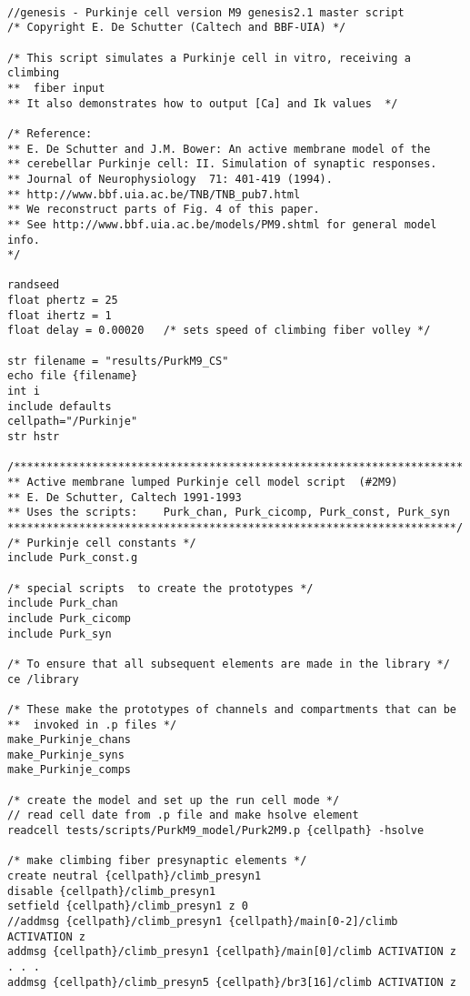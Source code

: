 \documentclass[10pt]{article}
\begin{document}
\begin{linenumbers}
\begin{verbatim}

//genesis - Purkinje cell version M9 genesis2.1 master script
/* Copyright E. De Schutter (Caltech and BBF-UIA) */

/* This script simulates a Purkinje cell in vitro, receiving a climbing
**  fiber input 
** It also demonstrates how to output [Ca] and Ik values  */

/* Reference:
** E. De Schutter and J.M. Bower: An active membrane model of the
** cerebellar Purkinje cell: II. Simulation of synaptic responses.
** Journal of Neurophysiology  71: 401-419 (1994).
** http://www.bbf.uia.ac.be/TNB/TNB_pub7.html
** We reconstruct parts of Fig. 4 of this paper.
** See http://www.bbf.uia.ac.be/models/PM9.shtml for general model info.
*/

randseed 
float phertz = 25
float ihertz = 1
float delay = 0.00020	/* sets speed of climbing fiber volley */

str filename = "results/PurkM9_CS"
echo file {filename}
int i
include defaults
cellpath="/Purkinje"
str hstr

/*********************************************************************
** Active membrane lumped Purkinje cell model script  (#2M9)
** E. De Schutter, Caltech 1991-1993 
** Uses the scripts:	Purk_chan, Purk_cicomp, Purk_const, Purk_syn
*********************************************************************/
/* Purkinje cell constants */
include Purk_const.g 

/* special scripts  to create the prototypes */
include Purk_chan 
include Purk_cicomp
include Purk_syn 

/* To ensure that all subsequent elements are made in the library */
ce /library

/* These make the prototypes of channels and compartments that can be
**  invoked in .p files */
make_Purkinje_chans
make_Purkinje_syns
make_Purkinje_comps

/* create the model and set up the run cell mode */
// read cell date from .p file and make hsolve element
readcell tests/scripts/PurkM9_model/Purk2M9.p {cellpath} -hsolve

/* make climbing fiber presynaptic elements */
create neutral {cellpath}/climb_presyn1
disable {cellpath}/climb_presyn1
setfield {cellpath}/climb_presyn1 z 0
//addmsg {cellpath}/climb_presyn1 {cellpath}/main[0-2]/climb ACTIVATION z
addmsg {cellpath}/climb_presyn1 {cellpath}/main[0]/climb ACTIVATION z
. . .
addmsg {cellpath}/climb_presyn5 {cellpath}/br3[16]/climb ACTIVATION z


\end{verbatim}
\end{linenumbers}
\end{document}
